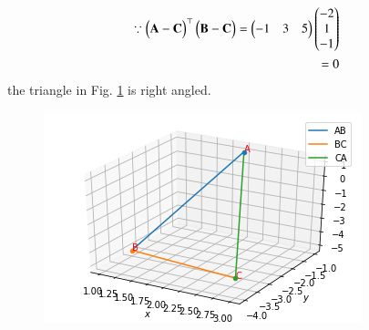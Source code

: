 
\begin{align}
\because \begin{pmatrix}\mathbf{A-C}\end{pmatrix}^\top\begin{pmatrix}\mathbf{B-C}\end{pmatrix}=\begin{pmatrix}-1&3&5\end{pmatrix}\begin{pmatrix}-2\\1\\-1\end{pmatrix}\\=0
\end{align}
the triangle in Fig.     \ref{fig:vec/2/4/} is right angled.
\begin{figure}[ht]
    \centering
    \includegraphics[width=\columnwidth]{solutions/su2021/2/4/Right angle triangle.png}
    \caption{}
    \label{fig:vec/2/4/}
    \end{figure} 

